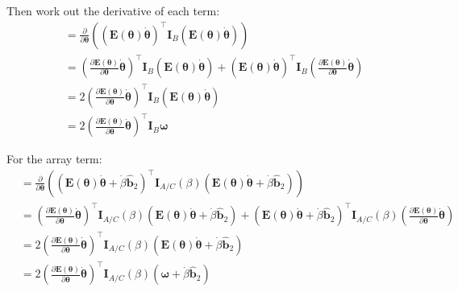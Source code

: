 \documentclass[titlepage]{article}
\begin{document}
Then work out the derivative of each term:
\begin{equation}
	\begin{split}
		&=\frac{\partial}{\partial\boldsymbol{\theta}}\left(\left(\boldsymbol{E}(\boldsymbol{\theta})\dot{\boldsymbol{\theta}}\right)^\top\boldsymbol{I}_B\left(\boldsymbol{E}(\boldsymbol{\theta})\dot{\boldsymbol{\theta}}\right)\right) \\
		&=\left(\frac{\partial\boldsymbol{E}(\boldsymbol{\theta})}{\partial\boldsymbol{\theta}}\dot{\boldsymbol{\theta}}\right)^\top\boldsymbol{I}_B\left(\boldsymbol{E}(\boldsymbol{\theta})\dot{\boldsymbol{\theta}}\right)+\left(\boldsymbol{E}(\boldsymbol{\theta})\dot{\boldsymbol{\theta}}\right)^\top\boldsymbol{I}_B\left(\frac{\partial\boldsymbol{E}(\boldsymbol{\theta})}{\partial\boldsymbol{\theta}}\dot{\boldsymbol{\theta}}\right) \\
		&=2\left(\frac{\partial\boldsymbol{E}(\boldsymbol{\theta})}{\partial\boldsymbol{\theta}}\dot{\boldsymbol{\theta}}\right)^\top\boldsymbol{I}_B\left(\boldsymbol{E}(\boldsymbol{\theta})\dot{\boldsymbol{\theta}}\right) \\
		&=2\left(\frac{\partial\boldsymbol{E}(\boldsymbol{\theta})}{\partial\boldsymbol{\theta}}\dot{\boldsymbol{\theta}}\right)^\top\boldsymbol{I}_B\boldsymbol{\omega}
	\end{split}
\end{equation}

For the array term:
\begin{equation}
	\begin{split}
		&=\frac{\partial}{\partial\boldsymbol{\theta}}\left(\left(\boldsymbol{E}(\boldsymbol{\theta})\dot{\boldsymbol{\theta}}+\dot{\beta}\hat{\boldsymbol{b}}_2\right)^\top\boldsymbol{I}_{A/C}(\beta)\left(\boldsymbol{E}(\boldsymbol{\theta})\dot{\boldsymbol{\theta}}+\dot{\beta}\hat{\boldsymbol{b}}_2\right)\right) \\
		&=\left(\frac{\partial\boldsymbol{E}(\boldsymbol{\theta})}{\partial\boldsymbol{\theta}}\dot{\boldsymbol{\theta}}\right)^\top\boldsymbol{I}_{A/C}(\beta)\left(\boldsymbol{E}(\boldsymbol{\theta})\dot{\boldsymbol{\theta}}+\dot{\beta}\hat{\boldsymbol{b}}_2\right)+\left(\boldsymbol{E}(\boldsymbol{\theta})\dot{\boldsymbol{\theta}}+\dot{\beta}\hat{\boldsymbol{b}}_2\right)^\top\boldsymbol{I}_{A/C}(\beta)\left(\frac{\partial\boldsymbol{E}(\boldsymbol{\theta})}{\partial\boldsymbol{\theta}}\dot{\boldsymbol{\theta}}\right) \\
		&=2\left(\frac{\partial\boldsymbol{E}(\boldsymbol{\theta})}{\partial\boldsymbol{\theta}}\dot{\boldsymbol{\theta}}\right)^\top\boldsymbol{I}_{A/C}(\beta)\left(\boldsymbol{E}(\boldsymbol{\theta})\dot{\boldsymbol{\theta}}+\dot{\beta}\hat{\boldsymbol{b}}_2\right) \\
		&=2\left(\frac{\partial\boldsymbol{E}(\boldsymbol{\theta})}{\partial\boldsymbol{\theta}}\dot{\boldsymbol{\theta}}\right)^\top\boldsymbol{I}_{A/C}(\beta)\left(\boldsymbol{\omega}+\dot{\beta}\hat{\boldsymbol{b}}_2\right)
	\end{split}
\end{equation}
\end{document}
